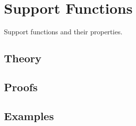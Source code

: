 
\section{Support Functions}
\label{sec:2.4.02-support-functions}

\begin{ticket}
Support functions and their properties.
\end{ticket}

\subsection*{Theory}

\subsection*{Proofs}

\subsection*{Examples}
